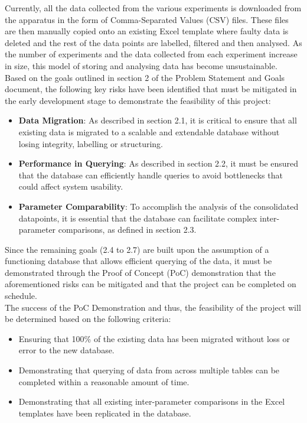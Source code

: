 \documentclass{article}
\begin{document}
Currently, all the data collected from the various experiments is downloaded from the 
apparatus in the form of Comma-Separated Values (CSV) files. These files are then manually
copied onto an existing Excel template where faulty data is deleted and the rest of the data points
are labelled, filtered and then analysed. As the number of experiments and the data collected
from each experiment increase in size, this model of storing and analysing data has
become unsustainable.\\
\newline
\noindent Based on the goals outlined in section 2 of the Problem Statement and Goals document,
the following key risks have been identified that must be mitigated in the early development
stage to demonstrate the feasibility of this project:
\begin{itemize}
  \item \textbf{Data Migration}: As described in section 2.1, it is critical to ensure that all existing 
  data is migrated to a scalable and extendable database without losing integrity, labelling or structuring.
  \item \textbf{Performance in Querying}: As described in section 2.2, it must be ensured that the database can 
  efficiently handle queries to avoid bottlenecks that could affect system usability.
  \item \textbf{Parameter Comparability}: To accomplish the analysis of the consolidated datapoints, it is essential
  that the database can facilitate complex inter-parameter comparisons, as defined in section 2.3.
\end{itemize}

\noindent Since the remaining goals (2.4 to 2.7) are built upon the assumption of a functioning database that 
allows efficient querying of the data, it must be demonstrated through the Proof of Concept (PoC) demonstration that the aforementioned 
risks can be mitigated and that the project can be completed on schedule.\\
\newline
\noindent The success of the PoC Demonstration and thus, the feasibility of the project will be determined based 
on the following criteria:
\begin{itemize}
  \item Ensuring that 100\% of the existing data has been migrated without loss or error to the new database.
  \item Demonstrating that querying of data from across multiple tables can be completed within a reasonable amount of time.
  \item Demonstrating that all existing inter-parameter comparisons in the Excel templates have been replicated in the database.
\end{itemize}
\end{document}
